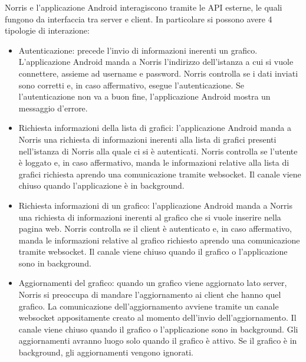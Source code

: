     Norris e l'applicazione Android interagiscono tramite le API esterne, le quali fungono da interfaccia tra server e client. In particolare si possono avere 4 tipologie di interazione:
    \begin{itemize}
        \item Autenticazione: precede l'invio di informazioni inerenti un grafico. L'applicazione Android manda a Norris l'indirizzo dell'istanza a cui si vuole connettere, assieme ad username e password. Norris controlla se i dati inviati sono corretti e, in caso affermativo, esegue l'autenticazione. Se l'autenticazione non va a buon fine, l'applicazione Android mostra un messaggio d'errore.
        \item Richiesta informazioni della lista di grafici: l'applicazione Android manda a Norris una richiesta di informazioni inerenti alla lista di grafici presenti nell'istanza di Norris alla quale ci si è autenticati. Norris controlla se l'utente è loggato e, in caso affermativo, manda le informazioni relative alla lista di grafici richiesta aprendo una comunicazione tramite websocket. Il canale viene chiuso quando l'applicazione è in background.
        \item Richiesta informazioni di un grafico: l'applicazione Android manda a Norris una richiesta di informazioni inerenti al grafico che si vuole inserire nella pagina web. Norris controlla se il client è autenticato e, in caso affermativo, manda le informazioni relative al grafico richiesto aprendo una comunicazione tramite websocket. Il canale viene chiuso quando il grafico o l'applicazione sono in background.
        \item Aggiornamenti del grafico: quando un grafico viene aggiornato lato server, Norris si preoccupa di mandare l'aggiornamento ai client che hanno quel grafico. La comunicazione dell'aggiornamento avviene tramite un canale websocket appositamente creato al momento dell'invio dell'aggiornamento. Il canale viene chiuso quando il grafico o l'applicazione sono in background. Gli aggiornamenti avranno luogo solo quando il grafico è attivo. Se il grafico è in background, gli aggiornamenti vengono ignorati.
    \end{itemize}
